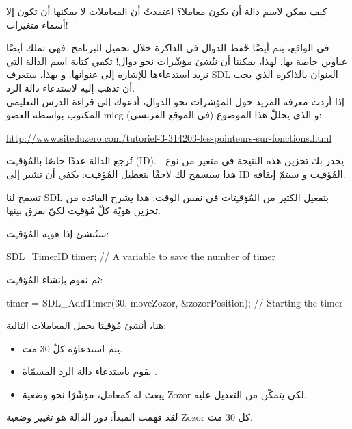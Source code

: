 \begin{question}
كيف يمكن لاسم دالة أن يكون معاملا؟ اعتقدتُ أن المعاملات لا يمكنها أن تكون إلا أسماء متغيرات!
\end{question}

في الواقع، يتم أيضًا حْفظ الدوال في الذاكرة خلال تحميل البرنامج. فهي تملك أيضًا عناوين خاصة بها. لهذا، يمكننا أن ننُشئ مؤشّرات نحو دوال! تكفي كتابة اسم الدالة التي نريد استدعاءها للإشارة إلى عنوانها. و بهذا، ستعرف \textenglish{SDL}
العنوان بالذاكرة الذي يجب أن تذهب إليه لاستدعاء دالة الرد.\\
إذا أردت معرفة المزيد حول المؤشرات نحو الدوال، أدعوك إلى قراءة الدرس التعليمي المكتوب بواسطة العضو 
\textenglish{mleg}
(في الموقع الفرنسي) و الذي يحللّ هذا الموضوع:

\url{http://www.siteduzero.com/tutoriel-3-314203-les-pointeurs-sur-fonctions.html}

تُرجع الدالة
عددًا خاصًا بالمُؤقـِت 
(\textenglish{ID}).
يجدر بك تخزين هذه النتيجة في متغير من نوع
.
هذا سيسمح لك لاحقًا بتعطيل المُؤقـِت: يكفي أن تشير إلى 
\textenglish{ID}
المُؤقـِت و سيتمّ إيقافه.

تسمح لنا \textenglish{SDL}
بتفعيل الكثير من المُؤقـِتات في نفس الوقت. هذا يشرح الفائدة من تخزين هويّة كلّ مُؤقـِت لكيّ نفرق بينها.

سنُنشئ إذا هوية المُؤقـِت:

\begin{Csource}
SDL_TimerID timer; // A variable to save the number of timer
\end{Csource}

ثم نقوم بإنشاء المُؤقـِت:

\begin{Csource}
timer = SDL_AddTimer(30, moveZozor, &zozorPosition); // Starting the timer 
\end{Csource}

هنا، أنشئ مُؤقـِتا يحمل المعاملات التالية:

\begin{itemize}
	\item يتم استدعاؤه كلّ 30 مث.
	\item يقوم باستدعاء دالة الرد المسمّاة 
	.
	\item يبعث له كمعامل، مؤشّرًا نحو وضعية
	\textenglish{Zozor}
	لكي يتمكّن من التعديل عليه.
\end{itemize}

لقد فهمت المبدأ: دور الدالة
هو تغيير وضعية
\textenglish{Zozor}
كل 30 مث.

